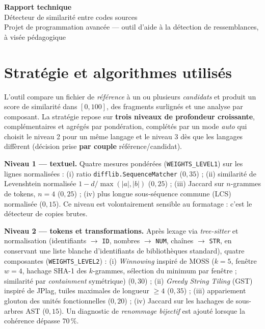 \documentclass[10pt,a4paper]{article}
\begin{document}
\begin{center}
  {\Large\bfseries Rapport technique}\\[2pt]
  {\large Détecteur de similarité entre codes sources}\\[2pt]
  {\small Projet de programmation avancée --- outil d'aide à la détection
  de ressemblances, à visée pédagogique}
\end{center}
\vspace{-2pt}

\section{Stratégie et algorithmes utilisés}

L'outil compare un fichier de \emph{référence} à un ou plusieurs
\emph{candidats} et produit un score de similarité dans $[0,100]$, des
fragments surlignés et une analyse par composant. La stratégie repose sur
\textbf{trois niveaux de profondeur croissante}, complémentaires et agrégés par
pondération, complétés par un mode \emph{auto} qui choisit le niveau 2 pour un
même langage et le niveau 3 dès que les langages diffèrent (décision prise
\textbf{par couple} référence/candidat).

\textbf{Niveau 1 --- textuel.} Quatre mesures pondérées
(\texttt{WEIGHTS\_LEVEL1}) sur les lignes normalisées :
(i) ratio \texttt{difflib.SequenceMatcher} ($0{,}35$) ;
(ii) similarité de Levenshtein normalisée $1-d/\max(|a|,|b|)$ ($0{,}25$) ;
(iii) Jaccard sur $n$-grammes de tokens, $n=4$ ($0{,}25$) ;
(iv) plus longue sous-séquence commune (LCS) normalisée ($0{,}15$).
Ce niveau est volontairement sensible au formatage : c'est le détecteur de
copies brutes.

\textbf{Niveau 2 --- tokens et transformations.} Après lexage via
\emph{tree-sitter} et normalisation (identifiants $\rightarrow$ \texttt{ID},
nombres $\rightarrow$ \texttt{NUM}, chaînes $\rightarrow$ \texttt{STR}, en
conservant une liste blanche d'identifiants de bibliothèques standard),
quatre composantes (\texttt{WEIGHTS\_LEVEL2}) :
(i) \emph{Winnowing} inspiré de MOSS ($k=5$, fenêtre $w=4$, hachage SHA-1 des
$k$-grammes, sélection du minimum par fenêtre ; similarité par \emph{containment}
symétrique) ($0{,}30$) ;
(ii) \emph{Greedy String Tiling} (GST) inspiré de JPlag, tuiles maximales de
longueur $\ge 4$ ($0{,}35$) ;
(iii) appariement glouton des unités fonctionnelles ($0{,}20$) ;
(iv) Jaccard sur les hachages de sous-arbres AST ($0{,}15$).
Un diagnostic de \emph{renommage bijectif} est ajouté lorsque la cohérence
dépasse $70\,\%$.
\end{document}

